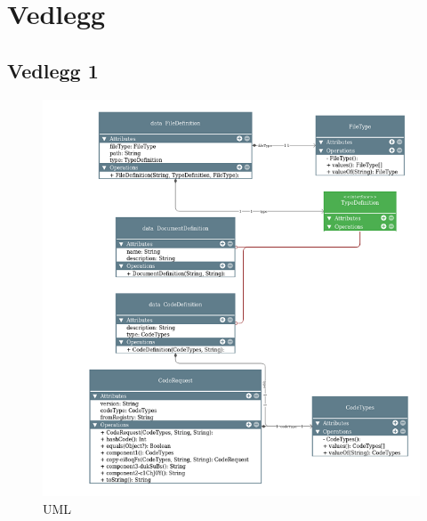 \section{Vedlegg}
\subsection{Vedlegg 1}
\begin{figure}[ht]
    \centering    \includegraphics{images/uml1.png}
    \caption{UML}
    \label{fig:my_label}
\end{figure}


